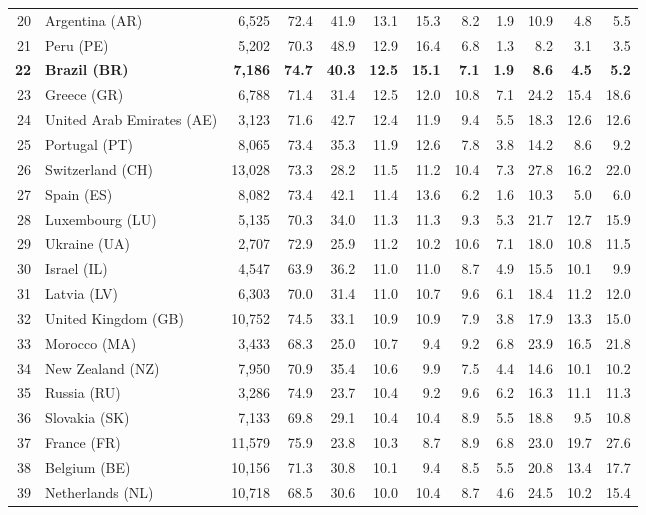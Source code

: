 \documentclass[10pt,a4paper,twocolumn]{article}
\begin{document}
\begin{tabular}{@{}rlrrrrrrrrrr@{}}
20 & Argentina (AR) & 6,525 & 72.4 & 41.9 & 13.1 & 15.3 & 8.2 & 1.9 & 10.9 & 4.8 & 5.5 \\
21 & Peru (PE) & 5,202 & 70.3 & 48.9 & 12.9 & 16.4 & 6.8 & 1.3 & 8.2 & 3.1 & 3.5 \\
\textbf{22} & \textbf{Brazil (BR)} & \textbf{7,186} & \textbf{74.7} & \textbf{40.3} & \textbf{12.5} & \textbf{15.1} & \textbf{7.1} & \textbf{1.9} & \textbf{8.6} & \textbf{4.5} & \textbf{5.2} \\
23 & Greece (GR) & 6,788 & 71.4 & 31.4 & 12.5 & 12.0 & 10.8 & 7.1 & 24.2 & 15.4 & 18.6 \\
24 & United Arab Emirates (AE) & 3,123 & 71.6 & 42.7 & 12.4 & 11.9 & 9.4 & 5.5 & 18.3 & 12.6 & 12.6 \\
25 & Portugal (PT) & 8,065 & 73.4 & 35.3 & 11.9 & 12.6 & 7.8 & 3.8 & 14.2 & 8.6 & 9.2 \\
26 & Switzerland (CH) & 13,028 & 73.3 & 28.2 & 11.5 & 11.2 & 10.4 & 7.3 & 27.8 & 16.2 & 22.0 \\
27 & Spain (ES) & 8,082 & 73.4 & 42.1 & 11.4 & 13.6 & 6.2 & 1.6 & 10.3 & 5.0 & 6.0 \\
28 & Luxembourg (LU) & 5,135 & 70.3 & 34.0 & 11.3 & 11.3 & 9.3 & 5.3 & 21.7 & 12.7 & 15.9 \\
29 & Ukraine (UA) & 2,707 & 72.9 & 25.9 & 11.2 & 10.2 & 10.6 & 7.1 & 18.0 & 10.8 & 11.5 \\
30 & Israel (IL) & 4,547 & 63.9 & 36.2 & 11.0 & 11.0 & 8.7 & 4.9 & 15.5 & 10.1 & 9.9 \\
31 & Latvia (LV) & 6,303 & 70.0 & 31.4 & 11.0 & 10.7 & 9.6 & 6.1 & 18.4 & 11.2 & 12.0 \\
32 & United Kingdom (GB) & 10,752 & 74.5 & 33.1 & 10.9 & 10.9 & 7.9 & 3.8 & 17.9 & 13.3 & 15.0 \\
33 & Morocco (MA) & 3,433 & 68.3 & 25.0 & 10.7 & 9.4 & 9.2 & 6.8 & 23.9 & 16.5 & 21.8 \\
34 & New Zealand (NZ) & 7,950 & 70.9 & 35.4 & 10.6 & 9.9 & 7.5 & 4.4 & 14.6 & 10.1 & 10.2 \\
35 & Russia (RU) & 3,286 & 74.9 & 23.7 & 10.4 & 9.2 & 9.6 & 6.2 & 16.3 & 11.1 & 11.3 \\
36 & Slovakia (SK) & 7,133 & 69.8 & 29.1 & 10.4 & 10.4 & 8.9 & 5.5 & 18.8 & 9.5 & 10.8 \\
37 & France (FR) & 11,579 & 75.9 & 23.8 & 10.3 & 8.7 & 8.9 & 6.8 & 23.0 & 19.7 & 27.6 \\
38 & Belgium (BE) & 10,156 & 71.3 & 30.8 & 10.1 & 9.4 & 8.5 & 5.5 & 20.8 & 13.4 & 17.7 \\
39 & Netherlands (NL) & 10,718 & 68.5 & 30.6 & 10.0 & 10.4 & 8.7 & 4.6 & 24.5 & 10.2 & 15.4 \\

\end{tabular}
\end{document}

